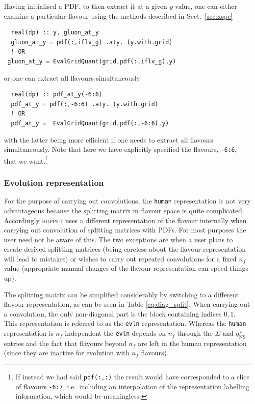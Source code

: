 \documentclass[12pt]{article}
\newcommand{\ie}{i.e.\ }
\newcommand{\hoppet}{\textsc{hoppet}\xspace}
\newcommand{\ttt}[1]{\texttt{#1}}
\begin{document}
Having initialised a PDF, to then extract it at a given $y$ value, one
can either examine a particular flavour using the methods described in
Sect.~\ref{sec:xspc}
\begin{lstlisting}
  real(dp) :: y, gluon_at_y
  gluon_at_y = pdf(:,iflv_g) .aty. (y.with.grid)
  ! OR
 gluon_at_y = EvalGridQuant(grid,pdf(:,iflv_g),y) 
\end{lstlisting}
or one can extract all flavours simultaneously
\begin{lstlisting}
  real(dp) :: pdf_at_y(-6:6)
  pdf_at_y = pdf(:,-6:6) .aty. (y.with.grid)
  ! OR
  pdf_at_y =  EvalGridQuant(grid,pdf(:,-6:6),y) 
\end{lstlisting}
with the latter being more efficient if one needs to extract all
flavours simultaneously. Note that here we have explicitly specified
the flavours, \ttt{-6:6}, that we want.\footnote{If instead we had
  said \ttt{pdf(:,:)} the result would have corresponded to a slice of
  flavours \ttt{-6:7}, \ie including an interpolation of the
  representation labelling information, which would be meaningless.}


\subsubsection{Evolution representation} 
\label{sec:evln-rep}
%
For the purpose of carrying out convolutions, the \ttt{human}
representation is not very advantageous because the splitting matrix
in flavour space is quite complicated. Accordingly \hoppet uses a
different representation of the flavour internally when carrying out
convolution of splitting matrices with PDFs. For most purposes the
user need not be aware of this. The two exceptions are when a user
plans to create derived splitting matrices (being careless about the
flavour representation will lead to mistakes) or wishes to carry out
repeated convolutions for a fixed $n_f$ value (appropriate manual
changes of the flavour representation can speed things up).


The splitting matrix can be simplified considerably by switching to a different
flavour representation, as can be seen in Table \ref{eq:diag_split}. 
 When carrying out a convolution, the only non-diagonal part is the
block containing indices $0,1$. This representation is referred to as
the \ttt{evln} representation. Whereas the \ttt{human} representation
is $n_f$-independent the \ttt{evln} depends on $n_f$ through the
$\Sigma$ and $q_{\mathrm{NS}}^{V}$ entries and the fact that flavours
beyond $n_f$ are left in the human representation (since they are
inactive for evolution with $n_f$ flavours).
\end{document}
